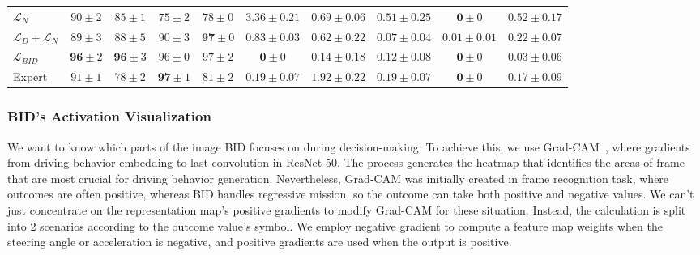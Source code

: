 \begin{table}
\begin{tabular}{lccccccccc}
		$\mathcal{L}_N$
		& $90\pm2$ & $85\pm1$ & $75\pm2$  & $78\pm0$  
		& $3.36\pm0.21$ & $0.69\pm0.06$ & $0.51\pm0.25$  & $\mathbf{0}\pm0$  & $0.52\pm0.17$    \\
		$\mathcal{L}_D+\mathcal{L}_N$
		& $89 \pm 3$ & $88 \pm 5$  & $90 \pm 3$ & $\mathbf{97} \pm 0$  
		& $0.83 \pm 0.03$ & $0.62 \pm 0.22$ & $\mathbf{0.07} \pm 0.04$  &  $0.01 \pm 0.01$ & $0.22 \pm 0.07$    \\
		$\mathcal{L}_{BID}$
		& $\mathbf{96} \pm 2$ & $\mathbf{96} \pm 3$ & $96 \pm 0$ & $97 \pm 2$ 
		&  $\mathbf{0} \pm 0$ & $\mathbf{0.14} \pm 0.18$  & $0.12 \pm 0.08$  & $\mathbf{0} \pm 0$  & $\mathbf{0.03} \pm 0.06$  \\
		Expert
		& $91 \pm 1$ & $78 \pm 2$ & $\mathbf{97} \pm 1$ & $81 \pm 2$ 
		& $0.19 \pm 0.07$ & $1.92 \pm 0.22$  & $0.19 \pm 0.07$ & $\mathbf{0} \pm 0$ & $0.17 \pm 0.09$   \\
		\hline
	\end{tabular}
	\vspace{-1ex}
	\vspace{-2.5ex}
	\label{table:infraction}
\end{table}


\subsubsection{BID's Activation Visualization}
\label{sec:Visualization}
\hspace{1pc}We want to know which parts of the image BID focuses on during decision-making. 
To achieve this, we use Grad-CAM~\cite{Selvaraju:2017}, where gradients from driving behavior embedding to last convolution in ResNet-50. 
The process generates the heatmap that identifies the areas of frame that are most crucial for driving behavior generation. 
Nevertheless, Grad-CAM was initially created in frame recognition task, where outcomes are often positive, whereas BID handles regressive mission, so the outcome can take both positive and negative values.
We can't just concentrate on the representation map's positive gradients to modify Grad-CAM for these situation.
Instead, the calculation is split into 2 scenarios according to the outcome value's symbol. 
We employ negative gradient to compute a feature map weights when the steering angle or acceleration is negative, and positive gradients are used when the output is positive.


